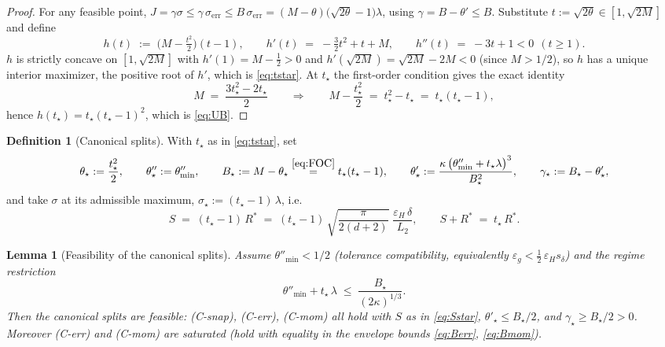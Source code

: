 \documentclass[11pt,a4paper]{article}
\theoremstyle{plain}
\newtheorem{lemma}{Lemma}
\theoremstyle{definition}
\newtheorem{definition}{Definition}
\newcommand{\eps}{\varepsilon}
\newcommand{\epsg}{\eps_{g}}
\newcommand{\epsH}{\eps_{H}}
\newcommand{\sdel}{s_{\delta}}
\newcommand{\Rstar}{R^{*}}
\newcommand{\serr}{\sigma_{\mathrm{err}}}
\newcommand{\tstar}{t_\star}
\newcommand{\thetamin}{\theta''_{\min}}
\begin{document}
\begin{proof}
For any feasible point, $J = \gamma\sigma \le \gamma\,\serr \le
B\,\serr = (M-\theta)\big(\sqrt{2\theta}-1\big)\lambda$, using
$\gamma = B - \theta' \le B$. Substitute $t := \sqrt{2\theta} \in
[1,\sqrt{2M}]$ and define
\[
h(t) \;:=\; \Big(M - \tfrac{t^2}{2}\Big)(t-1),
\qquad
h'(t) \;=\; -\tfrac{3}{2}t^2 + t + M,
\qquad
h''(t) \;=\; -3t+1 < 0 \ \ (t\ge 1).
\]
$h$ is strictly concave on $[1,\sqrt{2M}]$ with
$h'(1) = M - \tfrac12 > 0$ and
$h'(\sqrt{2M}) = \sqrt{2M} - 2M < 0$ (since $M>1/2$), so $h$ has a unique
interior maximizer, the positive root of $h'$, which is \eqref{eq:tstar}.
At $\tstar$ the first-order condition gives the exact identity
\begin{equation}\label{eq:FOC}
M \;=\; \frac{3\tstar^2 - 2\tstar}{2}
\qquad\Longrightarrow\qquad
M - \frac{\tstar^2}{2} \;=\; \tstar^2 - \tstar \;=\; \tstar(\tstar-1),
\end{equation}
hence $h(\tstar) = \tstar(\tstar-1)^2$, which is \eqref{eq:UB}.
\end{proof}

\begin{definition}[Canonical splits]\label{def:canonical}
With $\tstar$ as in \eqref{eq:tstar}, set
\begin{equation}\label{eq:canonical}
\theta_\star := \frac{\tstar^2}{2}, \qquad
\theta''_\star := \thetamin, \qquad
B_\star := M - \theta_\star
\overset{\eqref{eq:FOC}}{=} \tstar(\tstar-1), \qquad
\theta'_\star := \frac{\kappa\,\big(\thetamin +
\tstar\lambda\big)^3}{B_\star^2}, \qquad
\gamma_\star := B_\star - \theta'_\star ,
\end{equation}
and take $\sigma$ at its admissible maximum,
$\sigma_\star := (\tstar - 1)\,\lambda$, i.e.
\begin{equation}\label{eq:Sstar}
S \;=\; (\tstar-1)\,\Rstar
\;=\; (\tstar - 1)\,\sqrt{\frac{\pi}{2(d+2)}}\;\frac{\epsH\,\delta}{L_2},
\qquad
S + \Rstar \;=\; \tstar\,\Rstar .
\end{equation}
\end{definition}

\begin{lemma}[Feasibility of the canonical splits]\label{lem:feasible}
Assume $\thetamin < 1/2$ (tolerance compatibility, equivalently
$\epsg < \tfrac12\,\epsH\sdel$) and the \emph{regime restriction}
\begin{equation}\label{eq:Rprime}
\thetamin + \tstar\,\lambda \;\le\; \frac{B_\star}{(2\kappa)^{1/3}} .
\tag{R$'$}
\end{equation}
Then the canonical splits are feasible: \emph{(C-snap)}, \emph{(C-err)},
\emph{(C-mom)} all hold with $S$ as in \eqref{eq:Sstar},
$\theta'_\star \le B_\star/2$, and $\gamma_\star \ge B_\star/2 > 0$.
Moreover \emph{(C-err)} and \emph{(C-mom)} are \emph{saturated} (hold with
equality in the envelope bounds \eqref{eq:Berr}, \eqref{eq:Bmom}).
\end{lemma}
\end{document}
